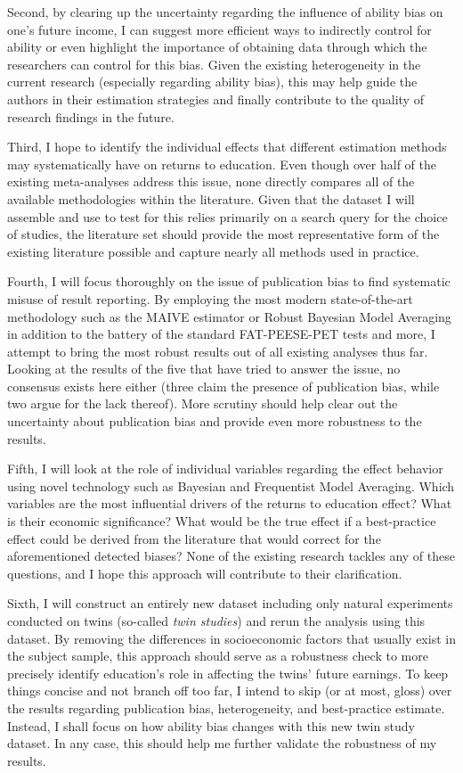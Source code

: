 Second, by clearing up the uncertainty regarding the influence of ability bias on one's future income, I can suggest more efficient ways to indirectly control for ability or even highlight the importance of obtaining data through which the researchers can control for this bias. Given the existing heterogeneity in the current research (especially regarding ability bias), this may help guide the authors in their estimation strategies and finally contribute to the quality of research findings in the future.

Third, I hope to identify the individual effects that different estimation methods may systematically have on returns to education. Even though over half of the existing meta-analyses address this issue, none directly compares all of the available methodologies within the literature. Given that the dataset I will assemble and use to test for this relies primarily on a search query for the choice of studies, the literature set should provide the most representative form of the existing literature possible and capture nearly all methods used in practice.

Fourth, I will focus thoroughly on the issue of publication bias to find systematic misuse of result reporting. By employing the most modern state-of-the-art methodology such as the MAIVE estimator \citep{irsova2023maive} or Robust Bayesian Model Averaging \citep{maier2022robust} in addition to the battery of the standard FAT-PEESE-PET tests and more, I attempt to bring the most robust results out of all existing analyses thus far. Looking at the results of the five that have tried to answer the issue, no consensus exists here either (three claim the presence of publication bias, while two argue for the lack thereof). More scrutiny should help clear out the uncertainty about publication bias and provide even more robustness to the results.

Fifth, I will look at the role of individual variables regarding the effect behavior using novel technology such as Bayesian and Frequentist Model Averaging. Which variables are the most influential drivers of the returns to education effect? What is their economic significance? What would be the true effect if a best-practice effect could be derived from the literature that would correct for the aforementioned detected biases? None of the existing research tackles any of these questions, and I hope this approach will contribute to their clarification.

Sixth, I will construct an entirely new dataset including only natural experiments conducted on twins (so-called \textit{twin studies}) and rerun the analysis using this dataset. By removing the differences in socioeconomic factors that usually exist in the subject sample, this approach should serve as a robustness check to more precisely identify education's role in affecting the twins' future earnings.  To keep things concise and not branch off too far, I intend to skip (or at most, gloss) over the results regarding publication bias, heterogeneity, and best-practice estimate. Instead, I shall focus on how ability bias changes with this new twin study dataset. In any case, this should help me further validate the robustness of my results.

